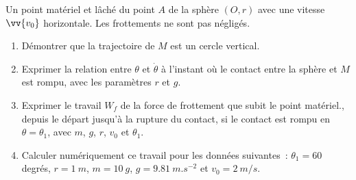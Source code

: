 %
\begin{exercice}
  Un point matériel et lâché du point $A$ de la sphère $(O, r)$ avec une vitesse $\vv{v_0}$ horizontale. Les frottements ne sont pas négligés.
  \begin{enumerate}
  \item Démontrer que la trajectoire de $M$ est un cercle vertical.
  \item Exprimer la relation entre $\theta$ et $\dot{\theta}$ à l'instant où le contact entre la sphère et $M$ est rompu, avec les paramètres $r$ et $g$.
  \item Exprimer le travail $W_f$ de la force de frottement que subit le point matériel., depuis le départ jusqu'à la rupture du contact, si le contact est rompu en $\theta=\theta_1$, avec $m$, $g$, $r$, $v_0$ et $\theta_1$.
  \item Calculer numériquement ce travail pour les données suivantes~: $\theta_1=60$ degrés, $r=\SI{1}{m}$, $m=\SI{10}{g}$, $g=\SI{9,81}{m.s^{-2}}$ et $v_0=\SI{2}{m/s}$.
  \end{enumerate}
\end{exercice}
